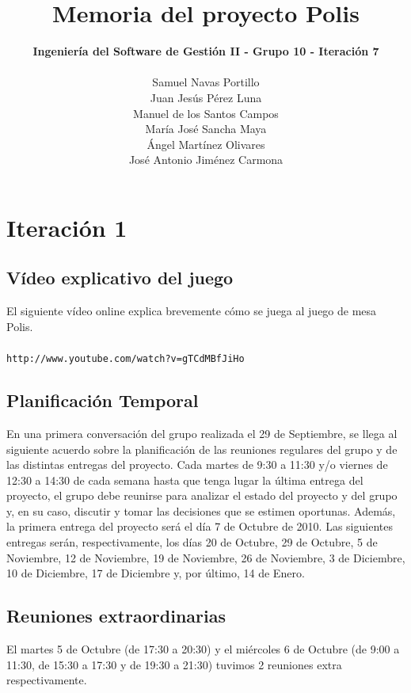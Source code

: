 \documentclass[11 pt]{book}
\begin{document}
\title{\textbf {\Huge Memoria del proyecto Polis}}
\author{
	\textbf {Ingeniería del Software de Gestión II - Grupo 10 - Iteración 7}\\\\
	Samuel Navas Portillo\\
	Juan Jesús Pérez Luna\\
	Manuel de los Santos Campos\\
	María José Sancha Maya\\
	Ángel Martínez Olivares\\
	José Antonio Jiménez Carmona}
\maketitle
\tableofcontents{}

\chapter{Iteración 1}
	\section{Vídeo explicativo del juego}
		El siguiente vídeo online explica brevemente cómo se juega al juego de mesa Polis.\\ \\
		\texttt{http://www.youtube.com/watch?v=gTCdMBfJiHo}
		
	\section{Planificación Temporal}
		En una primera conversación del grupo realizada el 29 de Septiembre, se llega al siguiente acuerdo sobre la planificación de las reuniones regulares del grupo y de las distintas entregas del proyecto. Cada martes de 9:30 a 11:30 y/o viernes de 12:30 a 14:30 de cada semana hasta que tenga lugar la última entrega del proyecto, el grupo debe reunirse para analizar el estado del proyecto y del grupo y, en su caso, discutir y tomar las decisiones que se estimen oportunas. Además, la primera entrega del proyecto será el día 7 de Octubre de 2010. Las siguientes entregas serán, respectivamente, los días 20 de Octubre, 29 de Octubre, 5 de Noviembre, 12 de Noviembre, 19 de Noviembre, 26 de Noviembre, 3 de Diciembre, 10 de Diciembre, 17 de Diciembre y, por último, 14 de Enero.
		
	\section{Reuniones extraordinarias}
		El martes 5 de Octubre (de 17:30 a 20:30) y el miércoles 6 de Octubre (de 9:00 a 11:30, de 15:30 a 17:30 y de 19:30 a 21:30) tuvimos 2 reuniones extra respectivamente.
	
\end{document}
